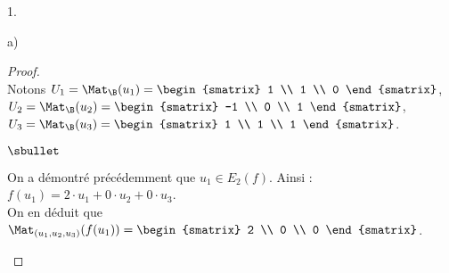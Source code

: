 \documentclass[11pt]{article}%
\begin{document}
\begin{noliste}{1.}
\begin{noliste}{a)}
    \begin{proof}~\\
      Notons $U_1 = \Mat_{\B}(u_1) =
        \begin{smatrix}
          1 \\
          1 \\
          0
        \end{smatrix}$, $U_2 = \Mat_{\B}(u_2) =
        \begin{smatrix}
          -1 \\
          0 \\
          1
        \end{smatrix}$, $U_3 = \Mat_{\B}(u_3) = 
        \begin{smatrix}
          1 \\
          1 \\
          1
        \end{smatrix}$.
      \begin{noliste}{$\sbullet$}
      \item On a démontré précédemment que $u_1 \in E_2(f)$. Ainsi : $
        f(u_1) = 2 \cdot u_1 + 0 \cdot u_2+0\cdot u_3 $.\\[.2cm]
        On en déduit que $\Mat_{(u_1, u_2, u_3)}(f(u_1)) =
        \begin{smatrix}
          2 \\
          0 \\
          0
        \end{smatrix}
        $.


\end{noliste}
\end{proof}
\end{noliste}
\end{noliste}
\end{document}
